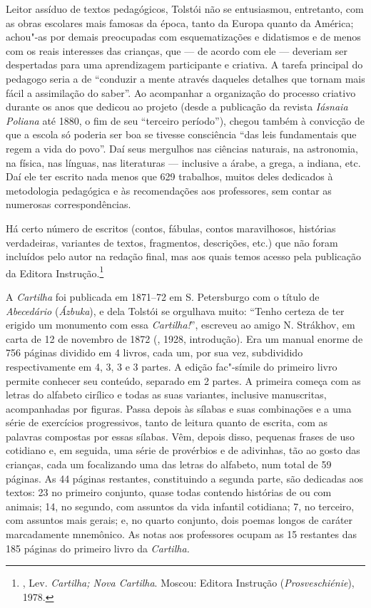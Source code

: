 Leitor assíduo de textos pedagógicos, Tolstói não se entusiasmou,
entretanto, com as obras escolares mais famosas da época, tanto da
Europa quanto da América; achou"-as por demais preocupadas com
esquematizações e didatismos e de menos com os reais interesses
das crianças, que --- de acordo com ele --- deveriam ser
despertadas para uma aprendizagem participante e criativa.
A tarefa principal do pedagogo seria a de ``conduzir a mente
através daqueles detalhes que tornam mais fácil a assimilação
do saber''. Ao acompanhar a organização do processo criativo
durante os anos que dedicou ao projeto (desde a publicação da
revista \emph{Iásnaia Poliana} até 1880, o fim de seu ``terceiro
período''), chegou também à convicção de que a escola só poderia
ser boa se tivesse consciência ``das leis fundamentais que regem
a vida do povo''. Daí seus mergulhos nas ciências naturais, na
astronomia, na física, nas línguas, nas literaturas --- inclusive
a árabe, a grega, a indiana, etc. Daí ele ter escrito nada menos
que 629 trabalhos, muitos deles dedicados à metodologia
pedagógica e às recomendações aos professores, sem contar
as numerosas correspondências. 

Há certo número de escritos (contos, fábulas, contos maravilhosos, histórias verdadeiras, variantes de textos, fragmentos, descrições, etc.) que não foram incluídos pelo autor na redação final, mas aos quais temos acesso pela publicação da Editora Instrução.\footnote{, Lev. \emph{Cartilha; Nova Cartilha}. Moscou: Editora Instrução (\emph{Prosveschiénie}), 1978.}

A \emph{Cartilha} foi publicada em 1871--72 em S. Petersburgo com o título
de \emph{Abecedário} (\emph{Ázbuka}), e dela Tolstói se
orgulhava muito: ``Tenho certeza de ter erigido um monumento
com essa \emph{Cartilha!}'', escreveu ao amigo N. Strákhov, em
carta de 12 de novembro de 1872 (, 1928,
introdução). Era um manual enorme de 756 páginas dividido em
4 livros, cada um, por sua vez, subdividido respectivamente em
4, 3, 3 e 3 partes. A edição fac"-símile do primeiro livro permite
conhecer seu conteúdo, separado em 2 partes. A primeira começa
com as letras do alfabeto cirílico e todas as suas variantes,
inclusive   manuscritas, acompanhadas por figuras. Passa depois
às sílabas e suas combinações e a uma série de exercícios
progressivos, tanto de leitura quanto de escrita, com as
palavras compostas por essas sílabas. Vêm, depois disso,
pequenas frases de uso cotidiano e, em seguida, uma série de
provérbios e de adivinhas, tão ao gosto das crianças, cada um
focalizando uma das letras do alfabeto, num total de 59 páginas.
As 44 páginas restantes, constituindo a segunda parte, são
dedicadas aos textos: 23 no primeiro conjunto, quase todas
contendo histórias de ou com animais; 14, no segundo, com
assuntos da vida infantil cotidiana; 7, no terceiro, com
assuntos mais gerais; e, no quarto conjunto, dois poemas
longos de caráter marcadamente mnemônico. As notas aos
professores ocupam as 15 restantes das 185 páginas do
primeiro livro da \emph{Cartilha.}

